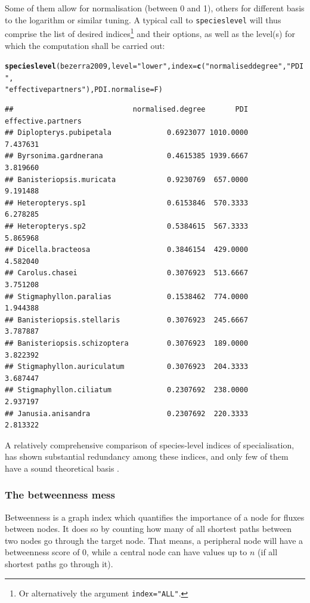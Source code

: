 \documentclass[a4paper, 11pt]{article}\usepackage[]{graphicx}\usepackage[]{color}
\makeatletter
\newcommand{\hlstr}[1]{\textcolor[rgb]{0.192,0.494,0.8}{#1}}%
\newcommand{\hlstd}[1]{\textcolor[rgb]{0.345,0.345,0.345}{#1}}%
\newcommand{\hlkwc}[1]{\textcolor[rgb]{0.333,0.667,0.333}{#1}}%
\newcommand{\hlkwd}[1]{\textcolor[rgb]{0.737,0.353,0.396}{\textbf{#1}}}%
\newenvironment{kframe}{%
 \def\at@end@of@kframe{}%
 \ifinner\ifhmode%
  \def\at@end@of@kframe{\end{minipage}}%
  \begin{minipage}{\columnwidth}%
 \fi\fi%
 \def\FrameCommand##1{\hskip\@totalleftmargin \hskip-\fboxsep
 \colorbox{shadecolor}{##1}\hskip-\fboxsep
     \hskip-\linewidth \hskip-\@totalleftmargin \hskip\columnwidth}%
 \MakeFramed {\advance\hsize-\width
   \@totalleftmargin\z@ \linewidth\hsize
   \@setminipage}}%
 {\par\unskip\endMakeFramed%
 \at@end@of@kframe}
\newenvironment{knitrout}{}{} %
\makeatother
\begin{document}
\noindent Some of them allow for normalisation (between 0 and 1), others for different basis to the logarithm or similar tuning. A typical call to \texttt{specieslevel} will thus comprise the list of desired indices\footnote{Or alternatively the argument \texttt{index="ALL"}.} and their options, as well as the level(s) for which the computation shall be carried out:
\begin{knitrout}
\color{fgcolor}\begin{kframe}
\begin{alltt}
\hlkwd{specieslevel}\hlstd{(bezerra2009,} \hlkwc{level}\hlstd{=}\hlstr{"lower"}\hlstd{,} \hlkwc{index}\hlstd{=}\hlkwd{c}\hlstd{(}\hlstr{"normalised degree"}\hlstd{,} \hlstr{"PDI"}\hlstd{,}
      \hlstr{"effective partners"}\hlstd{),} \hlkwc{PDI.normalise}\hlstd{=F)}
\end{alltt}
\begin{verbatim}
##                            normalised.degree       PDI effective.partners
## Diplopterys.pubipetala             0.6923077 1010.0000           7.437631
## Byrsonima.gardnerana               0.4615385 1939.6667           3.819660
## Banisteriopsis.muricata            0.9230769  657.0000           9.191488
## Heteropterys.sp1                   0.6153846  570.3333           6.278285
## Heteropterys.sp2                   0.5384615  567.3333           5.865968
## Dicella.bracteosa                  0.3846154  429.0000           4.582040
## Carolus.chasei                     0.3076923  513.6667           3.751208
## Stigmaphyllon.paralias             0.1538462  774.0000           1.944388
## Banisteriopsis.stellaris           0.3076923  245.6667           3.787887
## Banisteriopsis.schizoptera         0.3076923  189.0000           3.822392
## Stigmaphyllon.auriculatum          0.3076923  204.3333           3.687447
## Stigmaphyllon.ciliatum             0.2307692  238.0000           2.937197
## Janusia.anisandra                  0.2307692  220.3333           2.813322
\end{verbatim}
\end{kframe}
\end{knitrout}
A relatively comprehensive comparison of species-level indices of specialisation, \citet{Dormann2011} has shown substantial redundancy among these indices, and only few of them have a sound theoretical basis \citep{Poisot2012a}.

\subsubsection{The betweenness mess}
Betweenness is a graph index which quantifies the importance of a node for fluxes between nodes. It does so by counting how many of all shortest paths between two nodes go through the target node. That means, a peripheral node will have a betweenness score of 0, while a central node can have values up to $n$ (if all shortest paths go through it).
\end{document}
